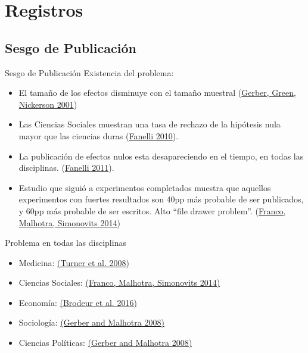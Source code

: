 \documentclass{beamer}
\begin{document}
\section{Registros}

\subsection*{Sesgo de Publicación}
\begin{frame}{Sesgo de Publicación}%
  Existencia del problema:
  \begin{itemize}
  \item
 El tamaño de los efectos disminuye con el tamaño muestral (\href{http://pan.oxfordjournals.org/content/9/4/385.short}{Gerber, Green, Nickerson 2001})
  \item
  Las Ciencias Sociales muestran una tasa de rechazo de la hipótesis nula mayor que las ciencias duras (\href{http://journals.plos.org/plosone/article?id=10.1371/journal.pone.0010068}{Fanelli 2010}).
  \item
  La publicación de efectos nulos esta desapareciendo en el tiempo, en todas las disciplinas. (\href{http://link.springer.com/article/10.1007/s11192-011-0494-7}{Fanelli 2011}). 
  \item
  Estudio que  siguió a experimentos completados muestra que aquellos experimentos con fuertes resultados son 40pp más probable de ser publicados, y 60pp más probable de ser escritos. Alto ``file drawer problem''. (\href{http://science.sciencemag.org/content/345/6203/1502}{Franco, Malhotra, Simonovits 2014})
  \end{itemize}
\end{frame}


\begin{frame}{Problema en todas las disciplinas}
\begin{itemize}[<.->]
\item Medicina: \href{http://www.nejm.org/doi/full/10.1056/nejmsa065779}{(Turner et al. 2008)}
\item Ciencias Sociales: \href{http://science.sciencemag.org/content/345/6203/1502.short}{(Franco, Malhotra, Simonovits 2014)}
\item Economía: \href{https://www.aeaweb.org/articles.php?doi=10.1257/app.20150044}{(Brodeur et al. 2016)}
\item Sociología: \href{http://smr.sagepub.com/content/37/1/3.short}{(Gerber and Malhotra 2008)}
\item Ciencias Políticas: \href{http://nowpublishers.com/article/Details/QJPS-8024}{(Gerber and Malhotra 2008)}
\end{itemize}
\end{frame}
\end{document}

